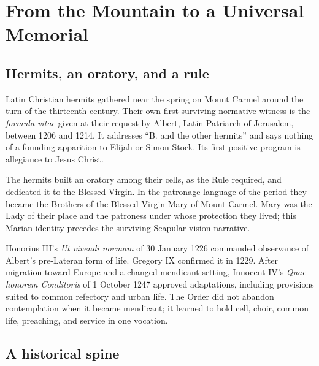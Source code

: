 \section{From the Mountain to a Universal Memorial}

\subsection{Hermits, an oratory, and a rule}

Latin Christian hermits gathered near the spring on Mount Carmel around the turn of the thirteenth century. Their own first surviving normative witness is the \textit{formula vitae} given at their request by Albert, Latin Patriarch of Jerusalem, between 1206 and 1214. It addresses ``B. and the other hermits'' and says nothing of a founding apparition to Elijah or Simon Stock. Its first positive program is allegiance to Jesus Christ.

The hermits built an oratory among their cells, as the Rule required, and dedicated it to the Blessed Virgin. In the patronage language of the period they became the Brothers of the Blessed Virgin Mary of Mount Carmel. Mary was the Lady of their place and the patroness under whose protection they lived; this Marian identity precedes the surviving Scapular-vision narrative.

Honorius III's \textit{Ut vivendi normam} of 30 January 1226 commanded observance of Albert's pre-Lateran form of life. Gregory IX confirmed it in 1229. After migration toward Europe and a changed mendicant setting, Innocent IV's \textit{Quae honorem Conditoris} of 1 October 1247 approved adaptations, including provisions suited to common refectory and urban life. The Order did not abandon contemplation when it became mendicant; it learned to hold cell, choir, common life, preaching, and service in one vocation.

\subsection{A historical spine}

